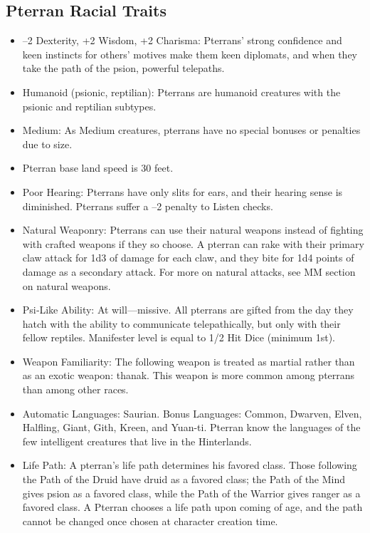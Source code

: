 \documentclass[10pt,a4paper,twocolumn]{d20}
\begin{document}
{\subsection{Pterran Racial Traits}
\begin{itemize}
    \item –2 Dexterity, +2 Wisdom, +2 Charisma: Pterrans’ strong confidence and keen instincts for others’ motives make them keen diplomats, and when they take the path of the psion, powerful telepaths.
    \item Humanoid (psionic, reptilian): Pterrans are humanoid creatures with the psionic and reptilian subtypes.
    \item Medium: As Medium creatures, pterrans have no special bonuses or penalties due to size.
    \item Pterran base land speed is 30 feet.
    \item Poor Hearing: Pterrans have only slits for ears, and their hearing sense is diminished. Pterrans suffer a –2 penalty to Listen checks.
    \item Natural Weaponry: Pterrans can use their natural weapons instead of fighting with crafted weapons if they so choose. A pterran can rake with their primary claw attack for 1d3 of damage for each claw, and they bite for 1d4 points of damage as a secondary attack. For more on natural attacks, see MM section on natural weapons.
    \item Psi‐Like Ability: At will---missive. All pterrans are gifted from the day they hatch with the ability to communicate telepathically, but only with their fellow reptiles. Manifester level is equal to 1/2 Hit Dice (minimum 1st).
    \item Weapon Familiarity: The following weapon is treated as martial rather than as an exotic weapon: thanak. This weapon is more common among pterrans than among other races.
    \item Automatic Languages: Saurian. Bonus Languages: Common, Dwarven, Elven, Halfling, Giant, Gith, Kreen, and Yuan-ti. Pterran know the languages of the few intelligent creatures that live in the Hinterlands.
    \item Life Path: A pterran’s life path determines his favored class. Those following the Path of the Druid have druid as a favored class; the Path of the Mind gives psion as a favored class, while the Path of the Warrior gives ranger as a favored class. A Pterran chooses a life path upon coming of age, and the path cannot be changed once chosen at character creation time.
\end{itemize}

}
\end{document}
